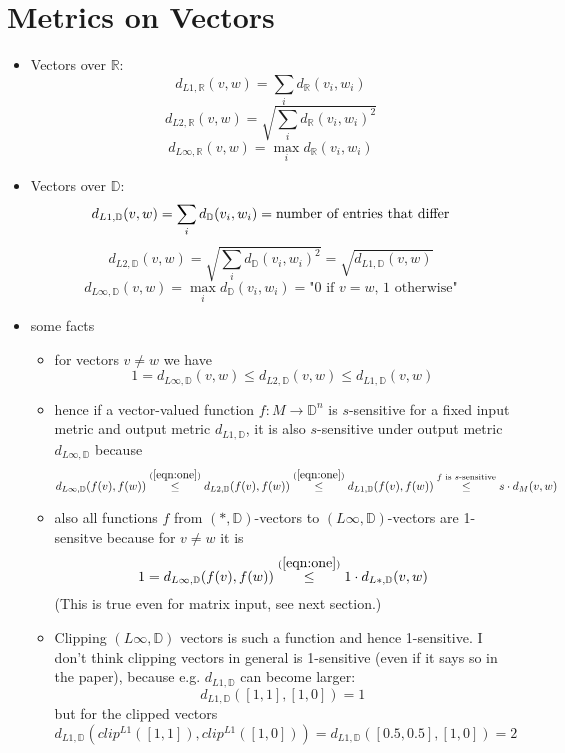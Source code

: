 \documentclass{article}
\begin{document}
\section*{Metrics on Vectors}
\begin{itemize}
   \item Vectors over $\mathbb{R}$:
      \[  d_{L1,\mathbb{R}}(v,w) = \sum_i d_\mathbb{R}(v_i, w_i) \]
      \[  d_{L2,\mathbb{R}}(v,w) = \sqrt{\sum_i d_\mathbb{R}(v_i, w_i)^2} \]
      \[  d_{L\infty,\mathbb{R}}(v,w) = \max_i d_\mathbb{R}(v_i, w_i) \]
   \item Vectors over $\mathbb{D}$:
      \[  d_{L1,\mathbb{D}}(v,w) = \sum_i d_\mathbb{D}(v_i, w_i) = \textnormal{number of entries that differ} \]
      \[  d_{L2,\mathbb{D}}(v,w) = \sqrt{\sum_i d_\mathbb{D}(v_i, w_i)^2} = \sqrt{d_{L1,\mathbb{D}}(v,w) } \]
      \[  d_{L\infty,\mathbb{D}}(v,w) = \max_i d_\mathbb{D}(v_i, w_i) = \text{"} 0 \text{ if } v=w \text{, 1 otherwise"} \]
   \item some facts
      \begin{itemize}
         \item for vectors $v\neq w$ we have
               \begin{equation}
                   \label{eqn:one}
                    1 = d_{{L\infty},\mathbb{D}}(v,w) \leq d_{L2,\mathbb{D}}(v,w) \leq d_{L1,\mathbb{D}}(v,w)
               \end{equation}
         \item hence if a vector-valued function $f:M\rightarrow\mathbb{D}^n$ is $s$-sensitive for a fixed input metric and output metric $d_{L1,\mathbb{D}}$, it is also $s$-sensitive under output metric $d_{L\infty,\mathbb{D}}$ because
         \[d_{L\infty,\mathbb{D}}(f(v),f(w))\overset{(\ref{eqn:one})}{\leq} d_{L2,\mathbb{D}}(f(v),f(w)) \overset{(\ref{eqn:one})}{\leq} d_{L1,\mathbb{D}}(f(v),f(w)) \overset{f \textnormal{ is $s$-sensitive}}{\leq} s \cdot d_M(v,w)\]
         \item also all functions $f$ from $(*,\mathbb{D})$-vectors to $(L\infty,\mathbb{D})$-vectors are 1-sensitve because for $v \neq w$ it is
         \[1 = d_{L\infty, \mathbb{D}}(f(v),f(w)) \overset{(\ref{eqn:one})}{\leq} 1 \cdot d_{L*, \mathbb{D}}(v,w)\]
         (This is true even for matrix input, see next section.)
         \item Clipping $(L\infty,\mathbb{D})$ vectors is such a function and hence 1-sensitive. I don't think clipping vectors in general is 1-sensitive (even if it says so in the paper), because e.g. $d_{L1,\mathbb{D}}$ can become larger:
            $$d_{L1,\mathbb{D}}([1,1],[1,0]) = 1$$
            but for the clipped vectors 
            $$d_{L1,\mathbb{D}}(clip^{L1}([1,1]), clip^{L1}([1,0])) = d_{L1,\mathbb{D}}([0.5,0.5],[1,0]) = 2$$
      \end{itemize}
\end{itemize}
\end{document}
